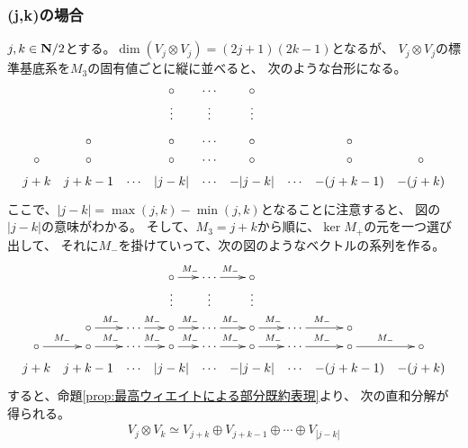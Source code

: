 {\subsubsection{(j,k)の場合}\label{s3:(j,k)の場合} %
	$j,k\in\mathbf{N}/2$とする。$\dim(V_j\otimes V_j)=(2j+1)(2k-1)$となるが、
	$V_j\otimes V_j$の標準基底系を$M_3$の固有値ごとに縦に並べると、
	次のような台形になる。
	\begin{equation*}\xymatrix@R=1ex@C=1ex{
		& & & \circ & \cdots & \circ & & & \\
		& & & \vdots & \vdots & \vdots & & & \\
		& \circ & & \circ & \cdots & \circ & & \circ & \\
		\circ & \circ & & \circ & \cdots & \circ & & \circ & \circ \\
		j + k & j + k - 1 & \cdots & |j - k| & \cdots 
			& - |j - k| & \cdots & - (j + k - 1) & - (j + k) \\
	}\end{equation*}
	ここで、$|j-k|=\max(j,k)-\min(j,k)$となることに注意すると、
	図の$|j-k|$の意味がわかる。
	そして、$M_3=j+k$から順に、$\ker M_+$の元を一つ選び出して、
	それに$M_-$を掛けていって、次の図のようなベクトルの系列を作る。
	\begin{equation*}\xymatrix@R=1ex@C=1ex{
		& & & \circ \ar[r]^{M_-} & \cdots \ar[r]^{M_-} & \circ \\
		& & & \vdots & \vdots & \vdots & & & \\
		& \circ \ar[r]^{M_-} & \cdots \ar[r]^{M_-} 
			& \circ \ar[r]^{M_-} & \cdots \ar[r]^{M_-} & \circ \ar[r]^{M_-} 
			& \cdots \ar[r]^{M_-} & \circ \\
		\circ \ar[r]^{M_-} & \circ \ar[r]^{M_-} & \cdots \ar[r]^{M_-} 
			& \circ \ar[r]^{M_-} & \cdots \ar[r]^{M_-} & \circ \ar[r]^{M_-} 
			& \cdots \ar[r]^{M_-} & \circ \ar[r]^{M_-} & \circ \\
		j + k & j + k - 1 & \cdots & |j - k| & \cdots 
			& - |j - k| & \cdots & - (j + k - 1) & - (j + k) \\
	}\end{equation*}
	すると、命題\ref{prop:最高ウィエイトによる部分既約表現}より、
	次の直和分解が得られる。
	\begin{equation*}\begin{split}
		V_j\otimes V_k \simeq V_{j+k}\oplus V_{j+k-1}\oplus\cdots\oplus
			V_{|j-k|}
	\end{split}\end{equation*}

}
